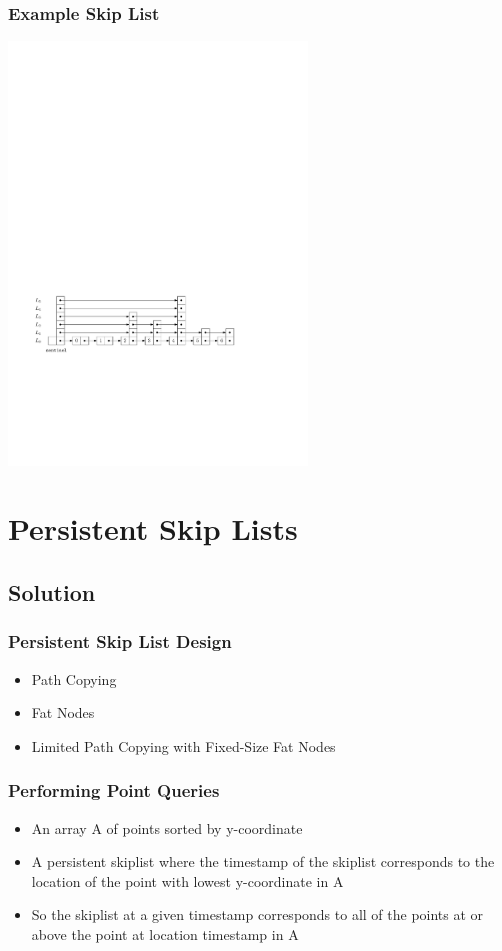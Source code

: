\documentclass{beamer}
\begin{document}
\begin{frame}
  \frametitle{Example Skip List}

  \begin{center}
    \includegraphics[width=300px]{figs/skiplist.pdf}
  \end{center}

\end{frame}

\section{Persistent Skip Lists}

\subsection{Solution}

\begin{frame}
  \frametitle{Persistent Skip List Design}

  \begin{itemize}
  \item
    Path Copying
  \item
    Fat Nodes
  \item
    Limited Path Copying with Fixed-Size Fat Nodes
  \end{itemize}

\end{frame}

\begin{frame}
  \frametitle{Performing Point Queries}

  \begin{itemize}
  \item
    An array A of points sorted by y-coordinate
  \item
    A persistent skiplist where the timestamp of the skiplist corresponds to the
    location of the point with lowest y-coordinate in A
  \item
    So the skiplist at a given timestamp corresponds to all of the points at or
    above the point at location timestamp in A
  \end{itemize}

\end{frame}
\end{document}
